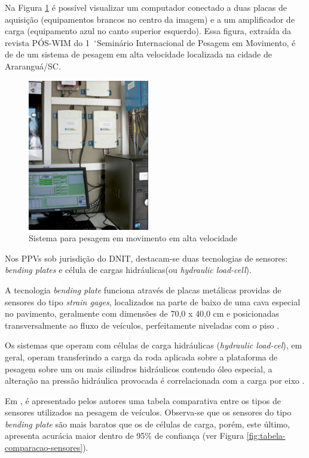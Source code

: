 \documentclass{ufscThesis}
\newcommand{\grad}{\hspace{-2mm}$\phantom{a}^{\circ}$}
\begin{document}
Na Figura \ref{fig:sistema-hswim} é possível visualizar um computador conectado a duas placas de aquisição (equipamentos brancos no centro da imagem) e a um amplificador de carga (equipamento azul no canto superior esquerdo). Essa figura, extraída da revista PÓS-WIM do 1\grad Seminário Internacional de Pesagem em Movimento, é de de um sistema de pesagem em alta velocidade localizada na cidade de Araranguá/SC.

\begin{figure}[h!]
  \caption{Sistema para pesagem em movimento em alta velocidade \cite{magazine:pos-wim-1}}
  \label{fig:sistema-hswim}
  \centering
    \includegraphics[scale=1]{./figuras/abrigo-pista-experimental.png}
\end{figure}

Nos PPVs sob jurisdição do DNIT, destacam-se duas tecnologias de sensores: \textit{bending plates} e célula de cargas hidráulicas(ou \textit{hydraulic load-cell}).

A tecnologia \textit{bending plate} funciona através de placas metálicas providas de sensores do tipo \textit{strain gages}, localizados na parte de baixo de uma cava especial no pavimento, geralmente com dimensões de 70,0 x 40,0 cm e posicionadas transversalmente ao fluxo de veículos, perfeitamente niveladas com o piso \cite{article:albanorevisando}.

Os sistemas que operam com células de carga hidráulicas (\textit{hydraulic load-cel}), em geral, operam transferindo a carga da roda aplicada sobre a plataforma de pesagem sobre um ou mais cilindros hidráulicos contendo óleo especial, a alteração na pressão hidráulica provocada é correlacionada com a carga por eixo \cite{article:albanorevisando}.

Em \cite[p. 8]{ref:zhang2007evaluating}, é apresentado pelos autores uma tabela comparativa entre os tipos de sensores utilizados na pesagem de veículos. Observa-se que os sensores do tipo \textit{bending plate} são mais baratos que os de células de carga, porém, este último, apresenta acurácia maior dentro de 95\% de confiança (ver Figura \ref{fig:tabela-comparacao-sensores}).
\end{document}
